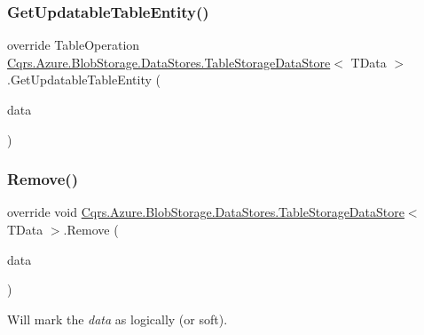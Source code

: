 \subsubsection{\texorpdfstring{Get\+Updatable\+Table\+Entity()}{GetUpdatableTableEntity()}\hspace{0.1cm}{\footnotesize\ttfamily [2/2]}}
{\footnotesize\ttfamily override Table\+Operation \hyperlink{classCqrs_1_1Azure_1_1BlobStorage_1_1DataStores_1_1TableStorageDataStore}{Cqrs.\+Azure.\+Blob\+Storage.\+Data\+Stores.\+Table\+Storage\+Data\+Store}$<$ T\+Data $>$.Get\+Updatable\+Table\+Entity (\begin{DoxyParamCaption}\item[{\hyperlink{classCqrs_1_1Azure_1_1BlobStorage_1_1EntityTableEntity}{Entity\+Table\+Entity}$<$ T\+Data $>$}]{data }\end{DoxyParamCaption})\hspace{0.3cm}{\ttfamily [protected]}}

\mbox{\label{classCqrs_1_1Azure_1_1BlobStorage_1_1DataStores_1_1TableStorageDataStore_a724d1188cdac6a7bfe7c753480f0c09a}} 
\subsubsection{\texorpdfstring{Remove()}{Remove()}}
{\footnotesize\ttfamily override void \hyperlink{classCqrs_1_1Azure_1_1BlobStorage_1_1DataStores_1_1TableStorageDataStore}{Cqrs.\+Azure.\+Blob\+Storage.\+Data\+Stores.\+Table\+Storage\+Data\+Store}$<$ T\+Data $>$.Remove (\begin{DoxyParamCaption}\item[{T\+Data}]{data }\end{DoxyParamCaption})}



Will mark the {\itshape data}  as logically (or soft). 

